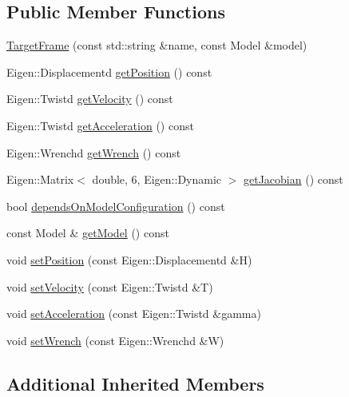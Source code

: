 \subsection*{Public Member Functions}
\begin{DoxyCompactItemize}
\item 
\hyperlink{classocra_1_1TargetFrame_ab7cf677c24a55434c4b285127235ae3c}{Target\+Frame} (const std\+::string \&name, const Model \&model)
\item 
Eigen\+::\+Displacementd \hyperlink{classocra_1_1TargetFrame_ab2f3bd3f05be243a5d9e2123b943986d}{get\+Position} () const
\item 
Eigen\+::\+Twistd \hyperlink{classocra_1_1TargetFrame_a5eeda88210d7002c3c73ba949139ed5b}{get\+Velocity} () const
\item 
Eigen\+::\+Twistd \hyperlink{classocra_1_1TargetFrame_ab38d91f0d2f90b102259ec155a8a1245}{get\+Acceleration} () const
\item 
Eigen\+::\+Wrenchd \hyperlink{classocra_1_1TargetFrame_a5e9ccc5e2e5ae8e52a37b5810a76115d}{get\+Wrench} () const
\item 
Eigen\+::\+Matrix$<$ double, 6, Eigen\+::\+Dynamic $>$ \hyperlink{classocra_1_1TargetFrame_a94d2746633b7112afae754370a3a3e1f}{get\+Jacobian} () const
\item 
bool \hyperlink{classocra_1_1TargetFrame_ab4512f64463c359090ffdbead9a9e349}{depends\+On\+Model\+Configuration} () const
\item 
const Model \& \hyperlink{classocra_1_1TargetFrame_acfd238567f0cfb9e6107cd17103ec6ea}{get\+Model} () const
\item 
void \hyperlink{classocra_1_1TargetFrame_a760081f3ae88a43ff91dc6a746083286}{set\+Position} (const Eigen\+::\+Displacementd \&H)
\item 
void \hyperlink{classocra_1_1TargetFrame_aff778ddb4526e90b927ec12bda52e8d6}{set\+Velocity} (const Eigen\+::\+Twistd \&T)
\item 
void \hyperlink{classocra_1_1TargetFrame_a3cbbcab6f3179320bd6c6f8c5aeabc75}{set\+Acceleration} (const Eigen\+::\+Twistd \&gamma)
\item 
void \hyperlink{classocra_1_1TargetFrame_a3d8e094de52e69b626322b6cce57d23e}{set\+Wrench} (const Eigen\+::\+Wrenchd \&W)
\end{DoxyCompactItemize}
\subsection*{Additional Inherited Members}


